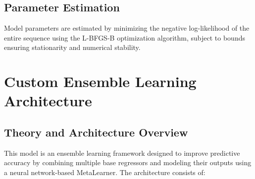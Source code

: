 \subsection{Parameter Estimation}

Model parameters are estimated by minimizing the negative log-likelihood of the entire sequence using the L-BFGS-B optimization algorithm, subject to bounds ensuring stationarity and numerical stability.




\section{Custom Ensemble Learning Architecture}

\subsection{Theory and Architecture Overview}

This model is an ensemble learning framework designed to improve predictive accuracy by combining multiple base regressors and modeling their outputs using a neural network-based MetaLearner. The architecture consists of:

